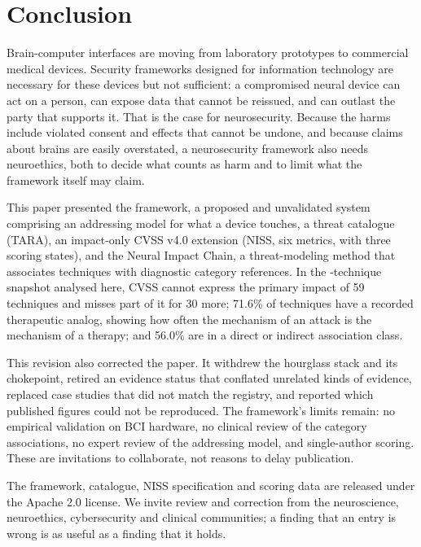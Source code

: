 
\section{Conclusion}
\label{sec:conclusion}

Brain-computer interfaces are moving from laboratory prototypes to commercial medical
devices. Security frameworks designed for information technology are necessary for these
devices but not sufficient: a compromised neural device can act on a person, can expose
data that cannot be reissued, and can outlast the party that supports it. That is the case
for neurosecurity. Because the harms include violated consent and effects that cannot be
undone, and because claims about brains are easily overstated, a neurosecurity framework
also needs neuroethics, both to decide what counts as harm and to limit what the framework
itself may claim.

This paper presented the \qif framework, a proposed and unvalidated system comprising an
addressing model for what a device touches, a threat catalogue (TARA), an impact-only CVSS
v4.0 extension (NISS, six metrics, with three scoring states), and the Neural Impact Chain,
a threat-modeling method that associates techniques with diagnostic category references.
In the \SnapshotTechniques{}-technique snapshot analysed here, CVSS cannot express the
primary impact of 59 techniques and misses part of it for 30 more; 71.6\% of techniques have
a recorded therapeutic analog, showing how often the mechanism of an attack is the mechanism
of a therapy; and 56.0\% are in a direct or indirect association class.

This revision also corrected the paper. It withdrew the hourglass stack and its chokepoint,
retired an evidence status that conflated unrelated kinds of evidence, replaced case studies
that did not match the registry, and reported which published figures could not be
reproduced. The framework's limits remain: no empirical validation on BCI hardware, no
clinical review of the category associations, no expert review of the addressing model, and
single-author scoring. These are invitations to collaborate, not reasons to delay
publication.

The framework, catalogue, NISS specification and scoring data are released under the
Apache 2.0 license. We invite review and correction from the neuroscience, neuroethics,
cybersecurity and clinical communities; a finding that an entry is wrong is as useful as a
finding that it holds.
